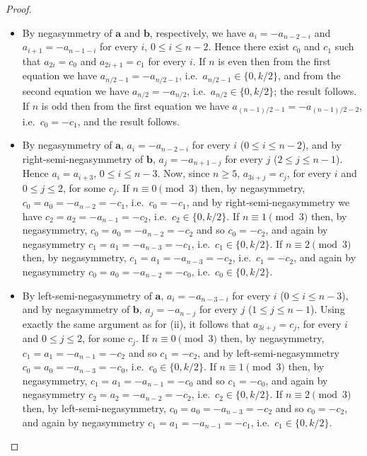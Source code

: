 \documentclass[a4paper,11pt]{article}
\theoremstyle{plain}
\theoremstyle{definition}
\theoremstyle{remark}
\begin{document}
\begin{proof}
\begin{itemize}
\item[i)] By negasymmetry of $\mathbf{a}$ and $\mathbf{b}$, respectively, we have
    $a_i=-a_{n-2-i}$ and $a_{i+1}=-a_{n-1-i}$ for every $i$, $0\leq i\leq n-2$.  Hence there
    exist $c_0$ and $c_1$ such that $a_{2i}=c_0$ and $a_{2i+1}=c_1$ for every $i$.
     \newline If $n$ is even then from the first equation we have
    $a_{n/2-1}=-a_{n/2-1}$, i.e.\ $a_{n/2-1}\in\{0,k/2\}$, and from the second equation we have
    $a_{n/2}=-a_{n/2}$, i.e.\ $a_{n/2}\in\{0,k/2\}$; the result follows.
     \newline If $n$ is odd then from the first equation we have $a_{(n-1)/2-1}=-a_{(n-1)/2-2}$,
    i.e.\ $c_0=-c_1$, and the result follows.

\item[ii)] By negasymmetry of $\mathbf{a}$, $a_i=-a_{n-2-i}$ for every $i$ ($0\leq i\leq n-2$),
    and by right-semi-negasymmetry of $\mathbf{b}$, $a_j=-a_{n+1-j}$ for every $j$ ($2\leq
    j\leq n-1$). Hence $a_i=a_{i+3}$, $0\leq i\leq n-3$. Now, since $n\geq5$, $a_{3i+j}=c_j$,
    for every $i$ and $0\leq j\leq 2$, for some $c_j$.
     \newline If $n\equiv0\pmod3$ then, by negasymmetry, $c_0=a_0=-a_{n-2}=-c_1$, i.e.\ $c_0=-c_1$,
    and by right-semi-negasymmetry we have $c_2=a_2=-a_{n-1}=-c_2$, i.e.\ $c_2\in\{0,k/2\}$.
     \newline If $n\equiv1\pmod3$ then, by negasymmetry, $c_0=a_0=-a_{n-2}=-c_2$ and so $c_0=-c_2$, and
     again by negasymmetry $c_1=a_1=-a_{n-3}=-c_1$, i.e.\ $c_1\in\{0,k/2\}$.
     \newline If $n\equiv2\pmod3$ then, by negasymmetry, $c_1=a_1=-a_{n-3}=-c_2$, i.e.\
     $c_1=-c_2$, and again by negasymmetry $c_0=a_0=-a_{n-2}=-c_0$, i.e.\ $c_0\in\{0,k/2\}$.

\item[iii)] By left-semi-negasymmetry of $\mathbf{a}$, $a_i=-a_{n-3-i}$ for every $i$ ($0\leq
    i\leq n-3$), and by negasymmetry of $\mathbf{b}$, $a_j=-a_{n-j}$ for every $j$ ($1\leq
    j\leq n-1$). Using exactly the same argument as for (ii), it follows that $a_{3i+j}=c_j$,
    for every $i$ and $0\leq j\leq 2$, for some $c_j$.
     \newline If $n\equiv0\pmod3$ then, by negasymmetry, $c_1=a_1=-a_{n-1}=-c_2$ and so $c_1=-c_2$,
    and by left-semi-negasymmetry $c_0=a_0=-a_{n-3}=-c_0$, i.e.\ $c_0\in\{0,k/2\}$.
     \newline If $n\equiv1\pmod3$ then, by negasymmetry, $c_1=a_1=-a_{n-1}=-c_0$ and so $c_1=-c_0$,
    and again by negasymmetry $c_2=a_2=-a_{n-2}=-c_2$, i.e.\ $c_2\in\{0,k/2\}$.
     \newline If $n\equiv2\pmod3$ then, by left-semi-negasymmetry, $c_0=a_0=-a_{n-3}=-c_2$ and so
    $c_0=-c_2$, and again by negasymmetry $c_1=a_1=-a_{n-1}=-c_1$, i.e.\ $c_1\in\{0,k/2\}$.


\end{itemize}
\end{proof}
\end{document}
